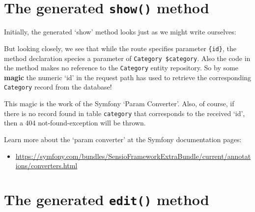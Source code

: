 \documentclass[a4paperpaper,openright]{book}
\newenvironment{Shaded}{}{}
\newcommand{\CommentTok}[1]{\textcolor[rgb]{0.38,0.63,0.69}{\textit{#1}}}
\newcommand{\KeywordTok}[1]{\textcolor[rgb]{0.00,0.44,0.13}{\textbf{#1}}}
\newcommand{\NormalTok}[1]{#1}
\newcommand{\OtherTok}[1]{\textcolor[rgb]{0.00,0.44,0.13}{#1}}
\newcommand{\StringTok}[1]{\textcolor[rgb]{0.25,0.44,0.63}{#1}}
\providecommand{\tightlist}{%
  \setlength{\itemsep}{0pt}\setlength{\parskip}{0pt}}
\begin{document}
\hypertarget{the-generated-show-method}{%
\section{\texorpdfstring{The generated \texttt{show()}
method}{The generated show() method}}\label{the-generated-show-method}}

Initially, the generated `show' method looks just as we might write
ourselves:

\begin{Shaded}
\end{Shaded}

But looking closely, we see that while the route specifies parameter
\texttt{\{id\}}, the method declaration species a parameter of
\texttt{Category\ \$category}. Also the code in the method makes no
reference to the \texttt{Category} entity repository. So by some
\textbf{magic} the numeric `id' in the request path has used to retrieve
the corresponding \texttt{Category} record from the database!

This magic is the work of the Symfony `Param Converter'. Also, of
course, if there is no record found in table \texttt{category} that
corresponds to the received `id', then a 404 not-found-exception will be
thrown.

Learn more about the `param converter' at the Symfony documentation
pages:

\begin{itemize}
\tightlist
\item
  \url{https://symfony.com/bundles/SensioFrameworkExtraBundle/current/annotations/converters.html}
\end{itemize}

\hypertarget{the-generated-edit-method}{%
\section{\texorpdfstring{The generated \texttt{edit()}
method}{The generated edit() method}}\label{the-generated-edit-method}}
\end{document}

